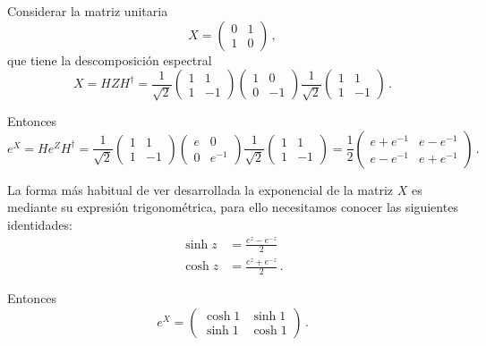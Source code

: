 \begin{eje}
  \label{eje:exponencial_x}
  Considerar la matriz unitaria
  \[
    X = \begin{pmatrix} 0 & 1 \\ 1 & 0 \end{pmatrix}\,,
  \]
  que tiene la descomposición espectral
  \[
    X = H Z H^\dagger = \frac{1}{\sqrt{2}}\begin{pmatrix} 1 & 1 \\ 1 & -1 \end{pmatrix}\begin{pmatrix} 1 & 0 \\ 0 & -1 \end{pmatrix}\frac{1}{\sqrt{2}}\begin{pmatrix} 1 & 1 \\ 1 & -1 \end{pmatrix}\,.
  \]

  Entonces
  \[
    e^X = H e^Z H^\dagger = \frac{1}{\sqrt{2}}\begin{pmatrix} 1 & 1 \\ 1 & -1 \end{pmatrix}\begin{pmatrix} e & 0 \\ 0 & e^{-1} \end{pmatrix}\frac{1}{\sqrt{2}}\begin{pmatrix} 1 & 1 \\ 1 & -1 \end{pmatrix} = \frac{1}{2}\begin{pmatrix} e+e^{-1} & e-e^{-1} \\ e-e^{-1} & e+e^{-1} \end{pmatrix}\,.
  \]

  La forma más habitual de ver desarrollada la exponencial de la matriz $X$ es mediante su expresión trigonométrica, para ello necesitamos conocer las siguientes identidades:
  \begin{align*}
    \sinh z & = \frac{e^z - e^{-z}}{2}    \\
    \cosh z & = \frac{e^z + e^{-z}}{2}\,.
  \end{align*}

  Entonces
  \[
    e^X = \begin{pmatrix} \cosh 1 & \sinh 1 \\ \sinh 1 & \cosh 1 \end{pmatrix}\,.
  \]
\end{eje}

